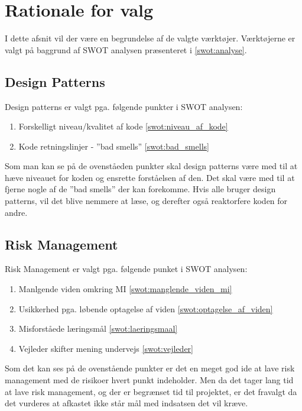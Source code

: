 \section{Rationale for valg}
I dette afsnit vil der være en begrundelse af de valgte værktøjer.
Værktøjerne er valgt på baggrund af SWOT analysen præsenteret i \cref{swot:analyse}.

\subsection{Design Patterns}\label{workshop2:designpatterns}
Design patterns er valgt pga. følgende punkter i SWOT analysen:
\begin{enumerate}
\item Forskelligt niveau/kvalitet af kode \cref{swot:niveau_af_kode}
\item Kode retningslinjer - ''bad smells'' \cref{swot:bad_smells}
\end{enumerate}

Som man kan se på de ovenståeden punkter skal design patterns være med til at hæve niveauet for koden og ensrette forståelsen af den.
Det skal være med til at fjerne nogle af de ''bad smells'' der kan forekomme.
Hvis alle bruger design patterns, vil det blive nemmere at læse, og derefter også reaktorfere koden for andre.

\subsection{Risk Management}
Risk Management er valgt pga. følgende punket i SWOT analysen:

\begin{enumerate}
\item Manlgende viden omkring MI \cref{swot:manglende_viden_mi}
\item Usikkerhed pga. løbende optagelse af viden \cref{swot:optagelse_af_viden}
\item Misforståede læringsmål \cref{swot:laeringsmaal}
\item Vejleder skifter mening undervejs \cref{swot:vejleder}
\end{enumerate}

Som det kan ses på de ovenstående punkter er det en meget god ide at lave risk management med de risikoer hvert punkt indeholder.
Men da det tager lang tid at lave risk management, og der er begrænset tid til projektet, er det fravalgt da det vurderes at afkastet ikke står mål med indsatsen det vil kræve.